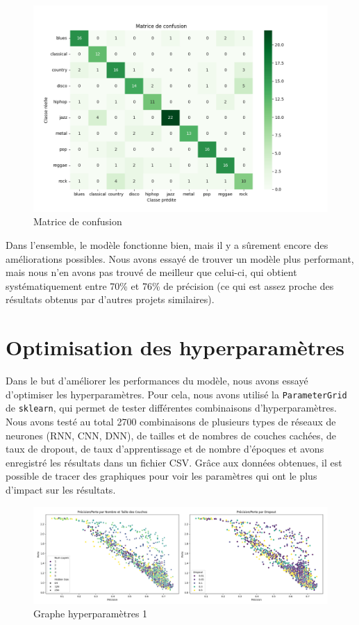 \documentclass{article}
\begin{document}
\begin{figure}[h!]
    \centering
    \includegraphics[width=\textwidth]{img/confusion_matrix.png}
    \caption{Matrice de confusion}
    \label{fig:confusion_matrix}
\end{figure}

Dans l'ensemble, le modèle fonctionne bien, mais il y a sûrement encore des améliorations possibles. Nous avons essayé de trouver un modèle plus performant, mais nous n'en avons pas trouvé de meilleur que celui-ci, qui obtient systématiquement entre 70\% et 76\% de précision (ce qui est assez proche des résultats obtenus par d'autres projets similaires).

\section{Optimisation des hyperparamètres}

Dans le but d'améliorer les performances du modèle, nous avons essayé d'optimiser les hyperparamètres. Pour cela, nous avons utilisé la \texttt{ParameterGrid} de \texttt{sklearn}, qui permet de tester différentes combinaisons d'hyperparamètres. Nous avons testé au total 2700 combinaisons de plusieurs types de réseaux de neurones (RNN, CNN, DNN), de tailles et de nombres de couches cachées, de taux de dropout, de taux d'apprentissage et de nombre d'époques et avons enregistré les résultats dans un fichier CSV. Grâce aux données obtenues, il est possible de tracer des graphiques pour voir les paramètres qui ont le plus d'impact sur les résultats.

\begin{figure}[h!]
    \centering
    \includegraphics[width=\textwidth]{img/hyperparameters_graph_1.png}
    \caption{Graphe hyperparamètres 1}
    \label{fig:hyperparameters_graph_1}
\end{figure}
\end{document}

